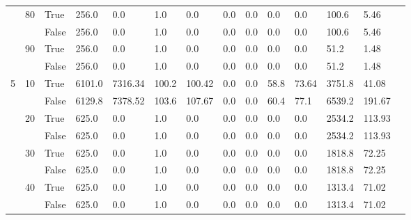 \begin{appendices}
\begin{landscape}
\begin{small}
\begin{longtable}[c]{@{}lll|ll|ll|ll|ll|lll@{}}
   & 80 & True  & 256.0           & 0.0            & 1.0           & 0.0           & 0.0           & 0.0           & 0.0           & 0.0           & 100.6         & 5.46        &  \\
   &    & False & 256.0           & 0.0            & 1.0           & 0.0           & 0.0           & 0.0           & 0.0           & 0.0           & 100.6         & 5.46        &  \\
   & 90 & True  & 256.0           & 0.0            & 1.0           & 0.0           & 0.0           & 0.0           & 0.0           & 0.0           & 51.2          & 1.48        &  \\
   &    & False & 256.0           & 0.0            & 1.0           & 0.0           & 0.0           & 0.0           & 0.0           & 0.0           & 51.2          & 1.48        &  \\
  \midrule
5  & 10 & True  & 6101.0          & 7316.34        & 100.2         & 100.42        & 0.0           & 0.0           & 58.8          & 73.64         & 3751.8        & 41.08       &  \\
   &    & False & 6129.8          & 7378.52        & 103.6         & 107.67        & 0.0           & 0.0           & 60.4          & 77.1          & 6539.2        & 191.67      &  \\
   & 20 & True  & 625.0           & 0.0            & 1.0           & 0.0           & 0.0           & 0.0           & 0.0           & 0.0           & 2534.2        & 113.93      &  \\
   &    & False & 625.0           & 0.0            & 1.0           & 0.0           & 0.0           & 0.0           & 0.0           & 0.0           & 2534.2        & 113.93      &  \\
   & 30 & True  & 625.0           & 0.0            & 1.0           & 0.0           & 0.0           & 0.0           & 0.0           & 0.0           & 1818.8        & 72.25       &  \\
   &    & False & 625.0           & 0.0            & 1.0           & 0.0           & 0.0           & 0.0           & 0.0           & 0.0           & 1818.8        & 72.25       &  \\
   & 40 & True  & 625.0           & 0.0            & 1.0           & 0.0           & 0.0           & 0.0           & 0.0           & 0.0           & 1313.4        & 71.02       &  \\
   &    & False & 625.0           & 0.0            & 1.0           & 0.0           & 0.0           & 0.0           & 0.0           & 0.0           & 1313.4        & 71.02       &  \\

\end{longtable}
\end{small}
\end{landscape}
\end{appendices}
